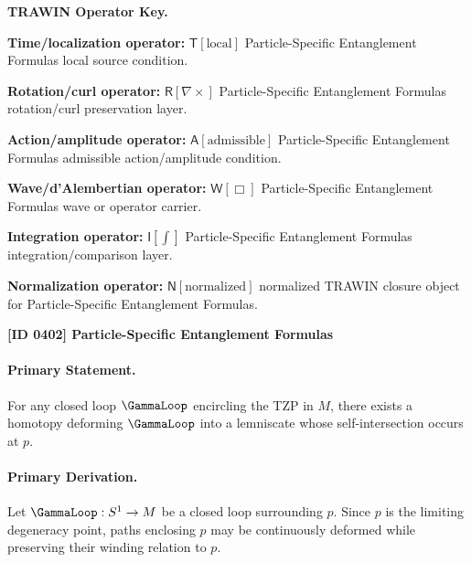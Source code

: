 \par\vspace{0.45\baselineskip}
\noindent\begin{minipage}[t]{\linewidth}
\begingroup
\small
\raggedright
\textbf{TRAWIN Operator Key.}\par
\noindent\textbf{Time/localization operator:} $\mathsf{T}\!\left[\mathrm{local}\right]$ Particle-Specific Entanglement Formulas local source condition.\par
\noindent\textbf{Rotation/curl operator:} $\mathsf{R}\!\left[\nabla\times\right]$ Particle-Specific Entanglement Formulas rotation/curl preservation layer.\par
\noindent\textbf{Action/amplitude operator:} $\mathsf{A}\!\left[\mathrm{admissible}\right]$ Particle-Specific Entanglement Formulas admissible action/amplitude condition.\par
\noindent\textbf{Wave/d'Alembertian operator:} $\mathsf{W}\!\left[\Box\right]$ Particle-Specific Entanglement Formulas wave or operator carrier.\par
\noindent\textbf{Integration operator:} $\mathsf{I}\!\left[\int\right]$ Particle-Specific Entanglement Formulas integration/comparison layer.\par
\noindent\textbf{Normalization operator:} $\mathsf{N}\!\left[\mathrm{normalized}\right]$ normalized TRAWIN closure object for Particle-Specific Entanglement Formulas.\par
\endgroup
\end{minipage}

\clearpage
\noindent\textbf{[ID 0402] Particle-Specific Entanglement Formulas}\par
\vspace{0.35em}
\paragraph{Primary Statement.}
For any closed loop $\GammaLoop$ encircling the TZP in $M$, there exists a homotopy deforming $\GammaLoop$ into a lemniscate whose self-intersection occurs at $p$.

\paragraph{Primary Derivation.}
Let $\GammaLoop:S^1\to M$ be a closed loop surrounding $p$. Since $p$ is the limiting degeneracy point, paths enclosing $p$ may be continuously deformed while preserving their winding relation to $p$.

